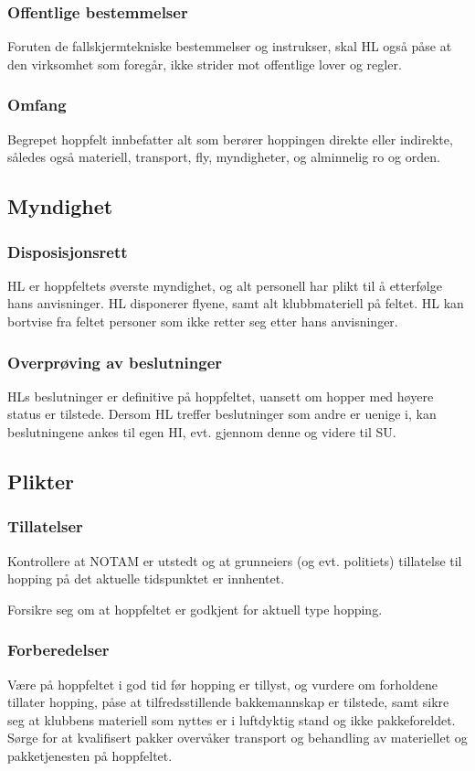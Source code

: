 \subsubsection{Offentlige bestemmelser}
Foruten de fallskjermtekniske bestemmelser og instrukser, skal HL også påse at den virksomhet som foregår, ikke strider mot offentlige lover og regler.

\subsubsection{Omfang}
Begrepet hoppfelt innbefatter alt som berører hoppingen direkte eller indirekte, således også materiell, transport, fly, myndigheter, og alminnelig ro og orden.

\subsection{Myndighet}
\subsubsection{Disposisjonsrett}
HL er hoppfeltets øverste myndighet, og alt personell har plikt til å etterfølge hans anvisninger. HL disponerer flyene, samt alt klubbmateriell på feltet. HL kan bortvise fra feltet personer som ikke retter seg etter hans anvisninger.

\subsubsection{Overprøving av beslutninger}
HLs beslutninger er definitive på hoppfeltet, uansett om hopper med høyere status er tilstede. Dersom HL treffer beslutninger som andre er uenige i, kan beslutningene ankes til egen HI, evt. gjennom denne og videre til SU.

\subsection{Plikter}
\subsubsection{Tillatelser}
Kontrollere at NOTAM er utstedt og at grunneiers (og evt. politiets) tillatelse til hopping på det aktuelle tidspunktet er innhentet.

Forsikre seg om at hoppfeltet er godkjent for aktuell type hopping.

\subsubsection{Forberedelser}
Være på hoppfeltet i god tid før hopping er tillyst, og vurdere om forholdene tillater hopping, påse at tilfredsstillende bakkemannskap er tilstede, samt sikre seg at klubbens materiell som nyttes er i luftdyktig stand og ikke pakkeforeldet. Sørge for at kvalifisert pakker overvåker transport og behandling av materiellet og pakketjenesten på hoppfeltet.

